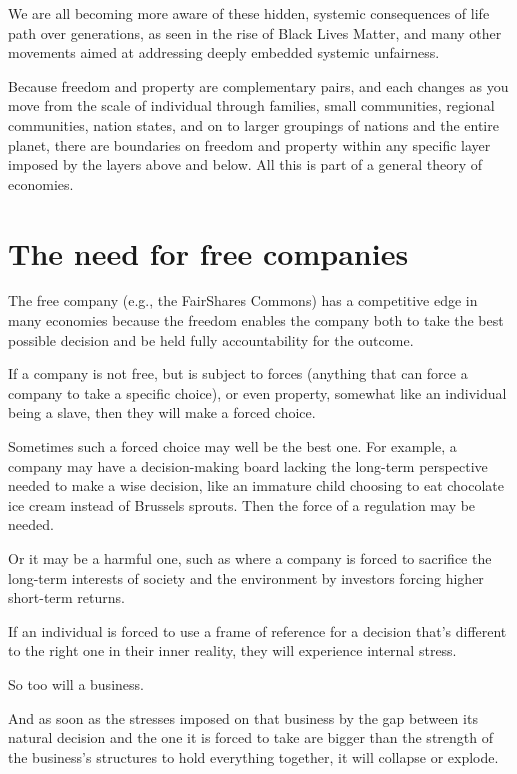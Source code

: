 We are all becoming more aware of these hidden, systemic consequences of life path over generations, as seen in the rise of Black Lives Matter, and many other movements aimed at addressing deeply embedded systemic unfairness.


Because freedom  and property are complementary pairs,  and each changes as you move from the scale of individual through families, small communities, regional communities, nation states, and on to larger groupings of nations and the entire planet, there are boundaries on freedom and property within any specific layer imposed by the layers above and below. All this is part of a general theory of economies. 






\section{The need for free companies}
The free company (e.g., the FairShares Commons) has a competitive edge in many economies because the freedom enables the company both to take the best possible decision and be held fully accountability for the outcome.


If a company is not free, but is subject to forces (anything that can force a company to take a specific choice), or even property, somewhat like an individual being a slave, then they will make a forced choice.


Sometimes such a forced choice may well be the best one. For example, a company may have a decision-making board lacking the long-term perspective needed to make a wise decision, like an immature child choosing to eat chocolate ice cream instead of Brussels sprouts. Then the force of a regulation may be needed.


Or it may be a harmful one, such as where a company is forced to sacrifice the long-term interests of society and the environment by investors forcing higher short-term returns. 


If an individual is forced to use a frame of reference for a decision that’s different to the right one in their inner reality, they will experience internal stress. 


So too will a business. 


And as soon as the stresses imposed on that business by the gap between its natural decision and the one it is forced to take are bigger than the strength of the business’s structures to hold everything together, it will collapse or explode.


